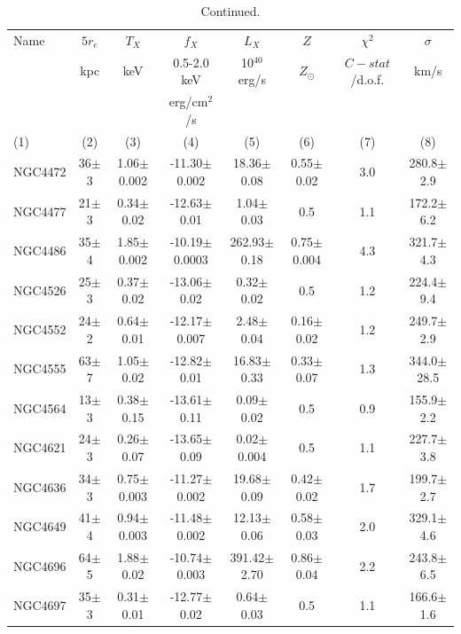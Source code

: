 \documentclass[iop]{emulateapj}
\begin{document}
\setcounter{table}{1}
\begin{table}
\centering
\caption{Continued.}
\begin{tabular}{lccccccc}
\hline
Name    & $5 r_e$ & $T_{X}$       &   $f_{X}$           & $L_X$             & $Z$     & $\chi^2$   &  $\sigma$            \\
        &   kpc       &   keV         &   0.5-2.0 keV       & 10$^{40}$ erg/s   &  $Z_{\odot}$       & $C-stat$/d.o.f. &    km/s           \\
        &             &               &   erg/cm$^2$/s      &                   &         &             &               \\
 (1)    &      (2)    &    (3)         &  (4)               &  (5)              &  (6)     &  (7)     &   (8)   \\   
\hline
NGC4472 & 36$\pm$3 & 1.06$\pm$0.002 & -11.30$\pm$0.002 & 18.36$\pm$0.08 & 0.55$\pm$0.02 & 3.0 & 280.8$\pm$2.9\\
NGC4477 & 21$\pm$3 & 0.34$\pm$0.02 & -12.63$\pm$0.01 & 1.04$\pm$0.03 & 0.5 & 1.1  & 172.2$\pm$6.2 \\
NGC4486 & 35$\pm$4 & 1.85$\pm$0.002 & -10.19$\pm$0.0003 & 262.93$\pm$0.18 & 0.75$\pm$0.004 & 4.3  & 321.7$\pm$4.3 \\
NGC4526 & 25$\pm$3 & 0.37$\pm$0.02  & -13.06$\pm$0.02  & 0.32$\pm$0.02 & 0.5 & 1.2  & 224.4$\pm$9.4\\
NGC4552 & 24$\pm$2 & 0.64$\pm$0.01  & -12.17$\pm$0.007 & 2.48$\pm$0.04 & 0.16$\pm$0.02 & 1.2  & 249.7$\pm$2.9\\
NGC4555 & 63$\pm$7 & 1.05$\pm$0.02  & -12.82$\pm$0.01  & 16.83$\pm$0.33 & 0.33$\pm$0.07 & 1.3  & 344.0$\pm$28.5\\
NGC4564 & 13$\pm$3 & 0.38$\pm$0.15 & -13.61$\pm$0.11  & 0.09$\pm$0.02 & 0.5 &  0.9  & 155.9$\pm$2.2\\
NGC4621 & 24$\pm$3 & 0.26$\pm$0.07 & -13.65$\pm$0.09  & 0.02$\pm$0.004 & 0.5 & 1.1  & 227.7$\pm$3.8\\
NGC4636 & 34$\pm$3 & 0.75$\pm$0.003 & -11.27$\pm$0.002  & 19.68$\pm$0.09  & 0.42$\pm$0.02 & 1.7  & 199.7$\pm$2.7 \\
NGC4649 & 41$\pm$4 & 0.94$\pm$0.003 & -11.48$\pm$0.002  & 12.13$\pm$0.06 & 0.58$\pm$0.03 & 2.0  & 329.1$\pm$4.6\\
NGC4696 & 64$\pm$5 & 1.88$\pm$0.02 & -10.74$\pm$0.003  & 391.42$\pm$2.70 & 0.86$\pm$0.04 &  2.2  & 243.8$\pm$6.5\\
NGC4697 & 35$\pm$3 & 0.31$\pm$0.01 & -12.77$\pm$0.02 & 0.64$\pm$0.03 & 0.5 & 1.1  & 166.6$\pm$1.6\\

\end{tabular}
\end{table}
\end{document}
